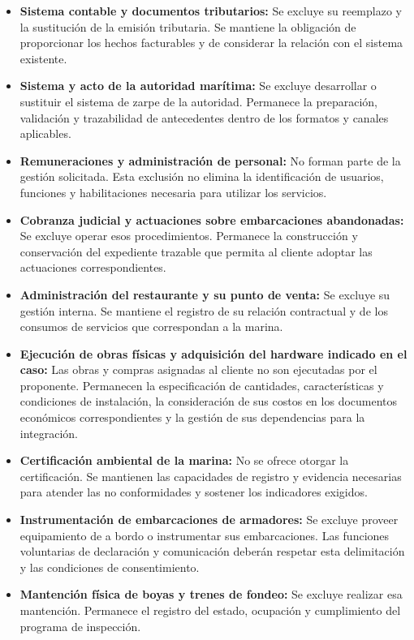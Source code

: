 \begin{itemize}
    \item \textbf{Sistema contable y documentos tributarios:} Se excluye su reemplazo y la sustitución de la emisión tributaria. Se mantiene la obligación de proporcionar los hechos facturables y de considerar la relación con el sistema existente.

    \item \textbf{Sistema y acto de la autoridad marítima:} Se excluye desarrollar o sustituir el sistema de zarpe de la autoridad. Permanece la preparación, validación y trazabilidad de antecedentes dentro de los formatos y canales aplicables.

    \item \textbf{Remuneraciones y administración de personal:} No forman parte de la gestión solicitada. Esta exclusión no elimina la identificación de usuarios, funciones y habilitaciones necesaria para utilizar los servicios.

    \item \textbf{Cobranza judicial y actuaciones sobre embarcaciones abandonadas:} Se excluye operar esos procedimientos. Permanece la construcción y conservación del expediente trazable que permita al cliente adoptar las actuaciones correspondientes.

    \item \textbf{Administración del restaurante y su punto de venta:} Se excluye su gestión interna. Se mantiene el registro de su relación contractual y de los consumos de servicios que correspondan a la marina.

    \item \textbf{Ejecución de obras físicas y adquisición del hardware indicado en el caso:} Las obras y compras asignadas al cliente no son ejecutadas por el proponente. Permanecen la especificación de cantidades, características y condiciones de instalación, la consideración de sus costos en los documentos económicos correspondientes y la gestión de sus dependencias para la integración.

    \item \textbf{Certificación ambiental de la marina:} No se ofrece otorgar la certificación. Se mantienen las capacidades de registro y evidencia necesarias para atender las no conformidades y sostener los indicadores exigidos.

    \item \textbf{Instrumentación de embarcaciones de armadores:} Se excluye proveer equipamiento de a bordo o instrumentar sus embarcaciones. Las funciones voluntarias de declaración y comunicación deberán respetar esta delimitación y las condiciones de consentimiento.

    \item \textbf{Mantención física de boyas y trenes de fondeo:} Se excluye realizar esa mantención. Permanece el registro del estado, ocupación y cumplimiento del programa de inspección.
\end{itemize}

